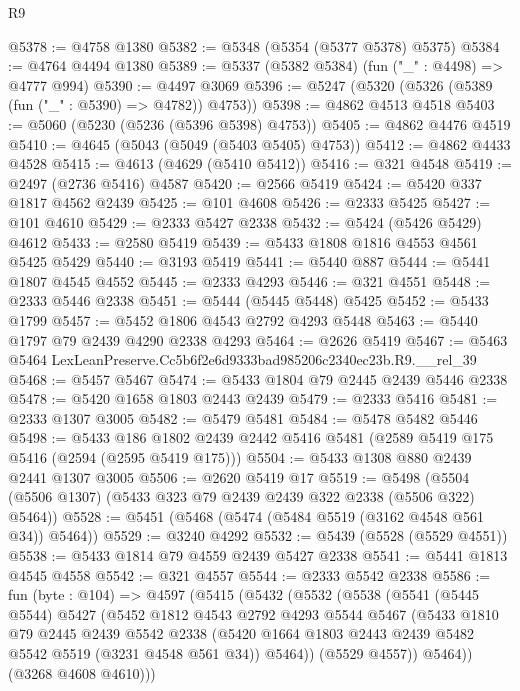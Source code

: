 \begin{lexlean}{R9}
\begin{coremodule}
@5378 := @4758 @1380
@5382 := @5348 (@5354 (@5377 @5378) @5375)
@5384 := @4764 @4494 @1380
@5389 := @5337 (@5382 @5384) (fun ("_" : @4498) => @4777 @994)
@5390 := @4497 @3069
@5396 := @5247 (@5320 (@5326 (@5389 (fun ("_" : @5390) => @4782)) @4753))
@5398 := @4862 @4513 @4518
@5403 := @5060 (@5230 (@5236 (@5396 @5398) @4753))
@5405 := @4862 @4476 @4519
@5410 := @4645 (@5043 (@5049 (@5403 @5405) @4753))
@5412 := @4862 @4433 @4528
@5415 := @4613 (@4629 (@5410 @5412))
@5416 := @321 @4548
@5419 := @2497 (@2736 @5416) @4587
@5420 := @2566 @5419
@5424 := @5420 @337 @1817 @4562 @2439
@5425 := @101 @4608
@5426 := @2333 @5425
@5427 := @101 @4610
@5429 := @2333 @5427 @2338
@5432 := @5424 (@5426 @5429) @4612
@5433 := @2580 @5419
@5439 := @5433 @1808 @1816 @4553 @4561 @5425 @5429
@5440 := @3193 @5419
@5441 := @5440 @887
@5444 := @5441 @1807 @4545 @4552
@5445 := @2333 @4293
@5446 := @321 @4551
@5448 := @2333 @5446 @2338
@5451 := @5444 (@5445 @5448) @5425
@5452 := @5433 @1799
@5457 := @5452 @1806 @4543 @2792 @4293 @5448
@5463 := @5440 @1797 @79 @2439 @4290 @2338 @4293
@5464 := @2626 @5419
@5467 := @5463 @5464 LexLeanPreserve.Cc5b6f2e6d9333bad985206c2340ec23b.R9.__rel_39
@5468 := @5457 @5467
@5474 := @5433 @1804 @79 @2445 @2439 @5446 @2338
@5478 := @5420 @1658 @1803 @2443 @2439
@5479 := @2333 @5416
@5481 := @2333 @1307 @3005
@5482 := @5479 @5481
@5484 := @5478 @5482 @5446
@5498 := @5433
    @186
    @1802
    @2439
    @2442
    @5416
    @5481
    (@2589 @5419 @175 @5416 (@2594 (@2595 @5419 @175)))
@5504 := @5433 @1308 @880 @2439 @2441 @1307 @3005
@5506 := @2620 @5419 @17
@5519 := @5498 (@5504 (@5506 @1307) (@5433 @323 @79 @2439 @2439 @322 @2338 (@5506 @322) @5464))
@5528 := @5451 (@5468 (@5474 (@5484 @5519 (@3162 @4548 @561 @34)) @5464))
@5529 := @3240 @4292
@5532 := @5439 (@5528 (@5529 @4551))
@5538 := @5433 @1814 @79 @4559 @2439 @5427 @2338
@5541 := @5441 @1813 @4545 @4558
@5542 := @321 @4557
@5544 := @2333 @5542 @2338
@5586 := fun (byte : @104) =>
  @4597
    (@5415
      (@5432
        (@5532
          (@5538
            (@5541
              (@5445 @5544)
              @5427
              (@5452
                @1812
                @4543
                @2792
                @4293
                @5544
                @5467
                (@5433
                  @1810
                  @79
                  @2445
                  @2439
                  @5542
                  @2338
                  (@5420 @1664 @1803 @2443 @2439 @5482 @5542 @5519 (@3231 @4548 @561 @34))
                  @5464))
              (@5529 @4557))
            @5464))
        (@3268 @4608 @4610)))

\end{coremodule}
\end{lexlean}
